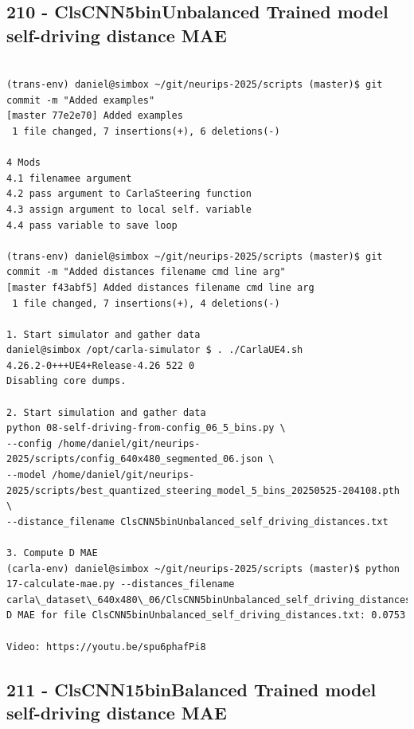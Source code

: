\subsection{210 - ClsCNN5binUnbalanced Trained model self-driving distance MAE}
\label{app_res:210}

\begin{verbatim}

(trans-env) daniel@simbox ~/git/neurips-2025/scripts (master)$ git commit -m "Added examples"
[master 77e2e70] Added examples
 1 file changed, 7 insertions(+), 6 deletions(-)
 
4 Mods
4.1 filenamee argument
4.2 pass argument to CarlaSteering function
4.3 assign argument to local self. variable
4.4 pass variable to save loop

(trans-env) daniel@simbox ~/git/neurips-2025/scripts (master)$ git commit -m "Added distances filename cmd line arg"
[master f43abf5] Added distances filename cmd line arg
 1 file changed, 7 insertions(+), 4 deletions(-)
 
1. Start simulator and gather data
daniel@simbox /opt/carla-simulator $ . ./CarlaUE4.sh 
4.26.2-0+++UE4+Release-4.26 522 0
Disabling core dumps.

2. Start simulation and gather data
python 08-self-driving-from-config_06_5_bins.py \
--config /home/daniel/git/neurips-2025/scripts/config_640x480_segmented_06.json \
--model /home/daniel/git/neurips-2025/scripts/best_quantized_steering_model_5_bins_20250525-204108.pth \
--distance_filename ClsCNN5binUnbalanced_self_driving_distances.txt

3. Compute D MAE
(carla-env) daniel@simbox ~/git/neurips-2025/scripts (master)$ python 17-calculate-mae.py --distances_filename carla\_dataset\_640x480\_06/ClsCNN5binUnbalanced_self_driving_distances.txt
D MAE for file ClsCNN5binUnbalanced_self_driving_distances.txt: 0.0753

Video: https://youtu.be/spu6phafPi8

\end{verbatim}

\subsection{211 - ClsCNN15binBalanced Trained model self-driving distance MAE}
\label{app_res:211}

